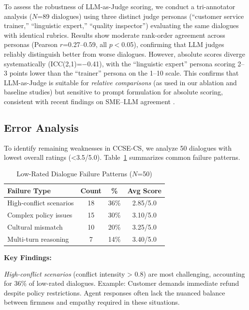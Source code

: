 \documentclass[11pt]{article}
\begin{document}
To assess the robustness of LLM-as-Judge scoring, we conduct a tri-annotator analysis ($N$=89 dialogues) using three distinct judge personas (``customer service trainer,'' ``linguistic expert,'' ``quality inspector'') evaluating the same dialogues with identical rubrics. Results show moderate rank-order agreement across personas (Pearson $r$=0.27--0.59, all $p<$0.05), confirming that LLM judges reliably distinguish better from worse dialogues. However, absolute scores diverge systematically (ICC(2,1)=$-$0.41), with the ``linguistic expert'' persona scoring 2--3 points lower than the ``trainer'' persona on the 1--10 scale. This confirms that LLM-as-Judge is suitable for \textit{relative comparisons} (as used in our ablation and baseline studies) but sensitive to prompt formulation for absolute scoring, consistent with recent findings on SME--LLM agreement \cite{llm_judge_limitations_2025}.

\subsection{Error Analysis}

To identify remaining weaknesses in CCSE-CS, we analyze 50 dialogues with lowest overall ratings (<3.5/5.0). Table~\ref{tab:error_analysis} summarizes common failure patterns.

\begin{table}[t]
\centering
\caption{Low-Rated Dialogue Failure Patterns ($N$=50)}
\label{tab:error_analysis}
\begin{tabular}{lccc}
\toprule
\textbf{Failure Type} & \textbf{Count} & \textbf{\%} & \textbf{Avg Score} \\
\midrule
High-conflict scenarios & 18 & 36\% & 2.85/5.0 \\
Complex policy issues & 15 & 30\% & 3.10/5.0 \\
Cultural mismatch & 10 & 20\% & 3.25/5.0 \\
Multi-turn reasoning & 7 & 14\% & 3.40/5.0 \\
\bottomrule
\end{tabular}
\end{table}

\textbf{Key Findings:}

\textit{High-conflict scenarios} (conflict intensity > 0.8) are most challenging, accounting for 36\% of low-rated dialogues. Example: Customer demands immediate refund despite policy restrictions. Agent responses often lack the nuanced balance between firmness and empathy required in these situations.
\end{document}
